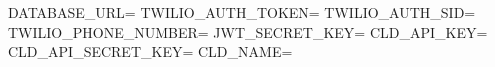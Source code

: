 DATABASE_URL=
TWILIO_AUTH_TOKEN=
TWILIO_AUTH_SID=
TWILIO_PHONE_NUMBER=
JWT_SECRET_KEY=
CLD_API_KEY=
CLD_API_SECRET_KEY=
CLD_NAME=